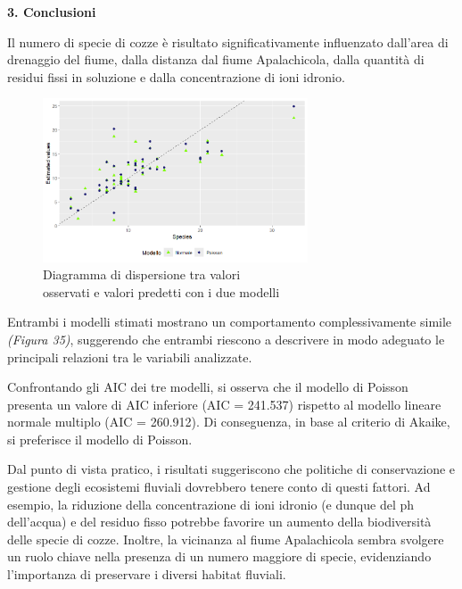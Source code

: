 \documentclass{article} %
\begin{document}
\vskip 30pt
\begin{flushleft}
    \textbf{\Huge 3. \: Conclusioni}
\end{flushleft}
\vskip 10pt

Il numero di specie di cozze è risultato significativamente influenzato dall'area di drenaggio del fiume, dalla distanza dal fiume Apalachicola, dalla quantità di residui fissi in soluzione e dalla concentrazione di ioni idronio.

\begin{figure}[H]
    \centering
    \includegraphics[width=0.7\textwidth]{immagini/lm_glm.png}
    \captionsetup{justification=centering}
    \caption{Diagramma di dispersione tra valori \\osservati e valori predetti con i due modelli}
\end{figure}

Entrambi i modelli stimati mostrano un comportamento complessivamente simile \textit{(Figura 35)}, suggerendo che entrambi riescono a descrivere in modo adeguato le principali relazioni tra le variabili analizzate.

Confrontando gli AIC dei tre modelli, si osserva che il modello di Poisson presenta un valore di AIC inferiore (AIC = 241.537) rispetto al modello lineare normale multiplo (AIC = 260.912). Di conseguenza, in base al criterio di Akaike, si preferisce il modello di Poisson.

Dal punto di vista pratico, i risultati suggeriscono che politiche di conservazione e gestione degli ecosistemi fluviali dovrebbero tenere conto di questi fattori. Ad esempio, la riduzione della concentrazione di ioni idronio (e dunque del ph dell'acqua) e del residuo fisso potrebbe favorire un aumento della biodiversità delle specie di cozze. Inoltre, la vicinanza al fiume Apalachicola sembra svolgere un ruolo chiave nella presenza di un numero maggiore di specie, evidenziando l'importanza di preservare i diversi habitat fluviali.
\end{document}
